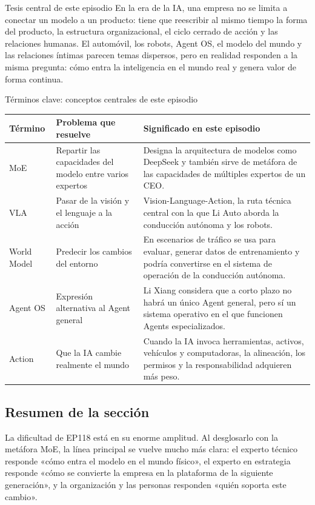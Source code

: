 \begin{importantbox}{Tesis central de este episodio}
En la era de la IA, una empresa no se limita a conectar un modelo a un producto: tiene que reescribir al mismo tiempo la forma del producto, la estructura organizacional, el ciclo cerrado de acción y las relaciones humanas. El automóvil, los robots, Agent OS, el modelo del mundo y las relaciones íntimas parecen temas dispersos, pero en realidad responden a la misma pregunta: cómo entra la inteligencia en el mundo real y genera valor de forma continua.
\end{importantbox}

\begin{knowledgebox}{Términos clave: conceptos centrales de este episodio}
\begin{tabularx}{\textwidth}{p{}p{}X}
\toprule
Término & Problema que resuelve & Significado en este episodio \\
\midrule
MoE & Repartir las capacidades del modelo entre varios expertos & Designa la arquitectura de modelos como DeepSeek y también sirve de metáfora de las capacidades de múltiples expertos de un CEO. \\
VLA & Pasar de la visión y el lenguaje a la acción & Vision-Language-Action, la ruta técnica central con la que Li Auto aborda la conducción autónoma y los robots. \\
World Model & Predecir los cambios del entorno & En escenarios de tráfico se usa para evaluar, generar datos de entrenamiento y podría convertirse en el sistema de operación de la conducción autónoma. \\
Agent OS & Expresión alternativa al Agent general & Li Xiang considera que a corto plazo no habrá un único Agent general, pero sí un sistema operativo en el que funcionen Agents especializados. \\
Action & Que la IA cambie realmente el mundo & Cuando la IA invoca herramientas, activos, vehículos y computadoras, la alineación, los permisos y la responsabilidad adquieren más peso. \\
\bottomrule
\end{tabularx}
\end{knowledgebox}

\subsection{Resumen de la sección}

La dificultad de EP118 está en su enorme amplitud. Al desglosarlo con la metáfora MoE, la línea principal se vuelve mucho más clara: el experto técnico responde «cómo entra el modelo en el mundo físico», el experto en estrategia responde «cómo se convierte la empresa en la plataforma de la siguiente generación», y la organización y las personas responden «quién soporta este cambio».
